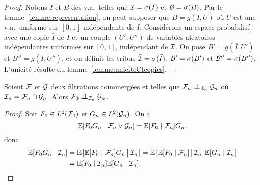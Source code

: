 \documentclass[12pt,a4paper]{article}
\begin{document}
\begin{appendices}
\begin{proof}
Notons $I$ et $B$ des v.a.\ telles que $\mathcal{I}=\sigma(I)$ et $\mathcal{B}=\sigma(B)$. 
Par le lemme~\ref{lemme:representation}, on peut supposer que 
$B=g(I,U)$ où $U$ est une v.a.\ uniforme sur $[0,1]$ indépendante de $I$. 
Considérons un espace probabilisé avec une copie $\bar I$ de $I$ 
et un couple $(U', U'')$ de variables aléatoires indépendantes uniformes sur 
$[0,1]$, indépendant de $\bar{\mathcal{I}}$. 
On pose $B'=g(\bar I, U')$ et $B''=g(\bar I, U'')$, et on définit les tribus 
$\bar {\mathcal{I}}=\sigma(\bar I)$, $\mathcal{B}' = \sigma(B')$ et $\mathcal{B}'' = \sigma(B'')$. 
L'unicité résulte du lemme~\ref{lemme:uniciteCIcopies}. 
\end{proof}


\begin{lemme}
Soient $\mathcal{F}$ et $\mathcal{G}$ deux filtrations co\"immergées et telles que 
$\FF_{n} \indep_{\II_{n}} \GG_{n}$ où $\mathcal{I}_{n} = \mathcal{F}_{n} \cap \mathcal{G}_{n}$. 
Alors  $\FF_{0} \indep_{\II_{n}} \GG_{n}$.  
\end{lemme}

\begin{proof}
Soit $F_0 \in L^2(\mathcal{F}_0)$ et $G_n \in L^2(\mathcal{G}_n)$. On a 
$$
\mathbb{E}[F_0G_n \mid \mathcal{F}_n \vee \mathcal{G}_n] = \mathbb{E}[F_0 \mid \mathcal{F}_n] G_n,
$$
donc 
\begin{align*}
\mathbb{E}[F_0G_n \mid \mathcal{I}_n] & = 
\mathbb{E}\bigl[\mathbb{E}[F_0 \mid \mathcal{F}_n] G_n \,\big\vert\, \mathcal{I}_n \bigr] 
= \mathbb{E}\bigl[\mathbb{E}[F_0 \mid \mathcal{F}_n] \,\big\vert\, \mathcal{I}_n \bigr] \mathbb{E}[G_n \mid \mathcal{I}_n ] \\
& = \mathbb{E}[F_0 \mid \mathcal{I}_n]  \mathbb{E}[G_n \mid \mathcal{I}_n ].
\end{align*}
\end{proof}

\end{appendices}
\end{document}
